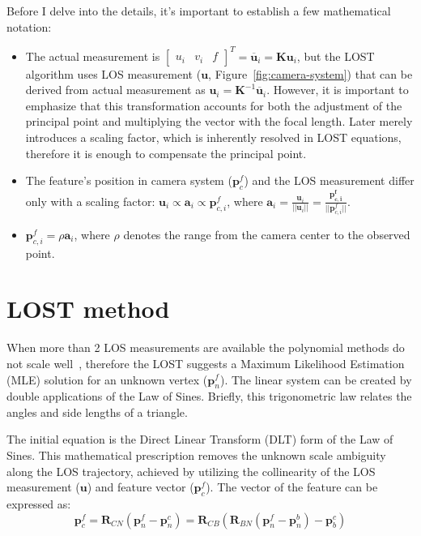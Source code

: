 Before I delve into the details, it's important to establish a few mathematical notation:
\begin{itemize}
    \item 
    The actual measurement is $\begin{bmatrix} u_i & v_i & f\end{bmatrix}^T = \overline{\mathbf{u}}_i = \mathbf{K}\mathbf{u}_i$, but the LOST algorithm uses LOS measurement ($\mathbf{u}$, Figure~\ref{fig:camera-system}) that can be derived from actual measurement as $\mathbf{u}_i=\mathbf{K}^{-1}\overline{\mathbf{u}}_i$. However, it is important to emphasize that this transformation accounts for both the adjustment of the principal point and multiplying the vector with the focal length. Later merely introduces a scaling factor, which is inherently resolved in LOST equations, therefore it is enough to compensate the principal point.

    \item 
    The feature's position in camera system ($\mathbf{p}_c^f$) and the LOS measurement differ only with a scaling factor: $\mathbf{u}_i \propto \mathbf{a}_{i} \propto \mathbf{p}_{c, i}^f$, where $\mathbf{a}_i=\frac{\mathbf{u}_i}{||\mathbf{u}_i||} = \frac{\mathbf{p_{c, i}^f}}{||\mathbf{p}_{c, i}^f||}$. 

    \item 
    $\mathbf{p}_{c, i}^f=\rho\mathbf{a}_i$, where $\rho$ denotes the range from the camera center to the observed point.
\end{itemize}

\section{LOST method}

When more than 2 LOS measurements are available the polynomial methods do not scale well~\cite{absolute-triangulation}, therefore the LOST suggests a Maximum Likelihood Estimation (MLE) solution for an unknown vertex ($\mathbf{p}_n^f$). The linear system can be created by double applications of the Law of Sines. Briefly, this trigonometric law relates the angles and side lengths of a triangle. 

The initial equation is the Direct Linear Transform (DLT) form of the Law of Sines. This mathematical prescription removes the unknown scale ambiguity along the LOS trajectory, achieved by utilizing the collinearity of the LOS measurement ($\mathbf{u}$) and feature vector ($\mathbf{p}_c^f$). The vector of the feature can be expressed as: 
\begin{equation}
    \mathbf{p}_c^f=\mathbf{R}_{CN}(\mathbf{p}_n^f-\mathbf{p}_n^c)=\mathbf{R}_{CB}(\mathbf{R}_{BN}(\mathbf{p}_n^f-\mathbf{p}_n^b)-\mathbf{p}_b^c)
    \label{eq:feature-in-cam}
\end{equation}

